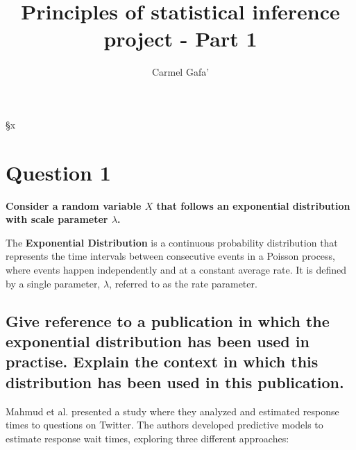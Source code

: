 §x\documentclass[]{article}
\title{Principles of statistical inference project - Part 1}
\author{Carmel Gafa'}
\date{}
\begin{document}
\maketitle


\section{Question 1}


\textbf{Consider a random variable $X$ that follows an exponential distribution with scale parameter $\lambda$.}
\bigskip

The \textbf{Exponential Distribution} is a continuous probability distribution that represents the time intervals between consecutive events in a Poisson process, where events happen independently and at a constant average rate. It is defined by a single parameter, $\lambda$, referred to as the rate parameter.


\subsection{Give reference to a publication in which the exponential distribution has been used in practise.  
	Explain the context in which this distribution has been used in this publication.}

Mahmud et al. presented a study where they analyzed and estimated response times to questions on Twitter\cite{mahmud2013will}. The authors developed predictive models to estimate response wait times, exploring three different approaches:
\end{document}

